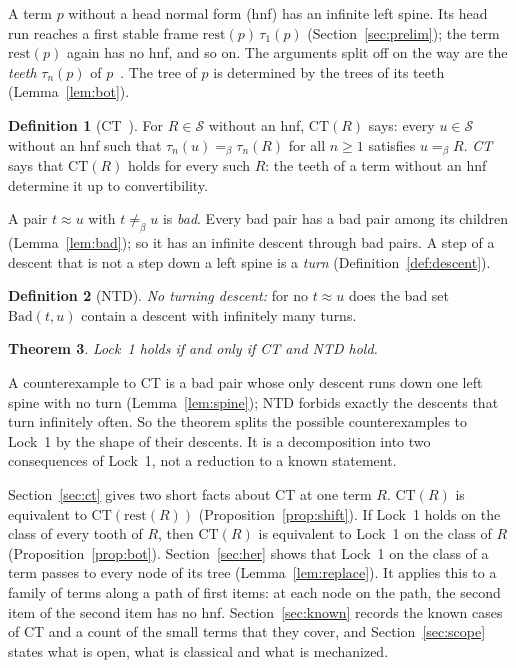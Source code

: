\documentclass[11pt]{amsart}
\newtheorem{theorem}{Theorem}
\theoremstyle{definition}
\newtheorem{definition}[theorem]{Definition}
\newcommand{\Ter}{\mathcal S}
\newcommand{\conv}{=_\beta}
\newcommand{\nconv}{\neq_\beta}
\newcommand{\rest}{\mathrm{rest}}
\newcommand{\Bad}{\mathrm{Bad}}
\newcommand{\CT}{\mathrm{CT}}
\begin{document}
A term $p$ without a head normal form (hnf) has an infinite left spine. Its head run reaches a first
stable frame $\rest(p)\,\tau_1(p)$ (Section~\ref{sec:prelim}); the term $\rest(p)$ again has no hnf,
and so on. The arguments split off on the way are the \emph{teeth} $\tau_n(p)$ of
$p$~\citep{s11}. The tree of $p$ is determined by the trees of its teeth (Lemma~\ref{lem:bot}).

\begin{definition}[CT~\citep{s11,s12}]\label{def:CT}
For $R\in\Ter$ without an hnf, $\CT(R)$ says: every $u\in\Ter$ without an hnf such that
$\tau_n(u)\conv\tau_n(R)$ for all $n\ge1$ satisfies $u\conv R$. \emph{CT} says that $\CT(R)$ holds for
every such $R$: the teeth of a term without an hnf determine it up to convertibility.
\end{definition}

A pair $t\approx u$ with $t\nconv u$ is \emph{bad}. Every bad pair has a bad pair among its
children (Lemma~\ref{lem:bad}); so it has an infinite descent through bad pairs. A step
of a descent that is not a step down a left spine is a \emph{turn}
(Definition~\ref{def:descent}).

\begin{definition}[NTD]\label{def:NTD}
\emph{No turning descent:} for no $t\approx u$ does the bad set $\Bad(t,u)$ contain a descent with
infinitely many turns.
\end{definition}

\begin{theorem}\label{thm:main}
Lock~1 holds if and only if CT and NTD hold.
\end{theorem}

A counterexample to CT is a bad pair whose only descent runs down one left spine with no turn
(Lemma~\ref{lem:spine}); NTD forbids exactly the descents that turn infinitely often. So the theorem
splits the possible counterexamples to Lock~1 by the shape of their descents. It is a decomposition
into two consequences of Lock~1, not a reduction to a known statement.

Section~\ref{sec:ct} gives two short facts about CT at one term $R$. $\CT(R)$ is equivalent to
$\CT(\rest(R))$ (Proposition~\ref{prop:shift}). If Lock~1 holds on the class of every tooth of
$R$, then $\CT(R)$ is equivalent to Lock~1 on the class of $R$
(Proposition~\ref{prop:bot}). Section~\ref{sec:her} shows that Lock~1 on the class of a term
passes to every node of its tree (Lemma~\ref{lem:replace}). It applies this to a family of terms
along a path of first items: at each node on the path, the second item of the second item has no
hnf. Section~\ref{sec:known} records the known cases of CT and a count of the small terms that they
cover, and Section~\ref{sec:scope} states what is open, what is classical and what is mechanized.
\end{document}

